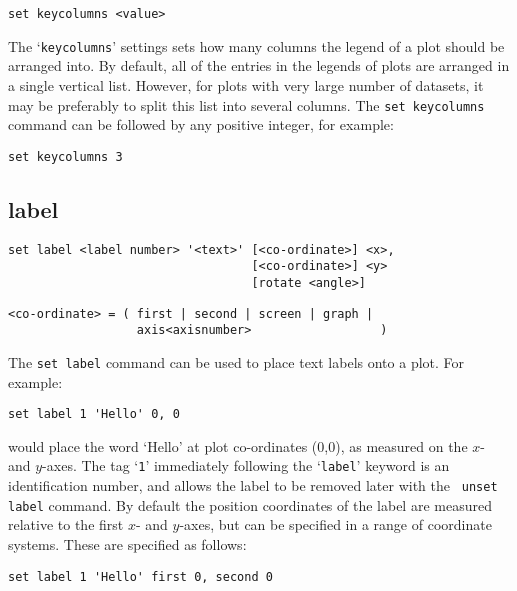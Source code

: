 \begin{verbatim}
set keycolumns <value>
\end{verbatim}

The `{\tt keycolumns}' settings sets how many columns the legend of a plot should
be arranged into. By default, all of the entries in the legends of plots are
arranged in a single vertical list. However, for plots with very large number
of datasets, it may be preferably to split this list into several columns. The
{\tt set keycolumns} command can be followed by any positive integer, for
example:

\begin{verbatim}
set keycolumns 3
\end{verbatim}


\subsection{label}

\begin{verbatim}
set label <label number> '<text>' [<co-ordinate>] <x>,
                                  [<co-ordinate>] <y>
                                  [rotate <angle>]
\end{verbatim}

\begin{verbatim}
<co-ordinate> = ( first | second | screen | graph |
                  axis<axisnumber>                  )
\end{verbatim}

The {\tt set label} command can be used to place text labels onto a plot.  For
example:

\begin{verbatim}
set label 1 'Hello' 0, 0
\end{verbatim}

\noindent would place the word `Hello' at plot co-ordinates (0,0), as measured on the $x$-
and $y$-axes.  The tag `{\tt 1}' immediately following the `{\tt label}' keyword is an
identification number, and allows the label to be removed later with the {\tt
unset label} command.  By default the position coordinates of the label are
measured relative to the first $x$- and $y$-axes, but can be specified in a
range of coordinate systems. These are specified as follows:

\begin{verbatim}
set label 1 'Hello' first 0, second 0
\end{verbatim}

